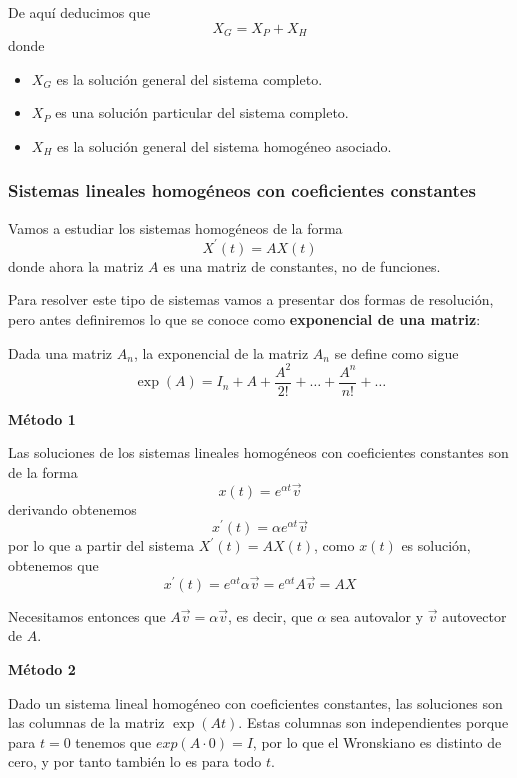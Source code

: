 De aquí deducimos que $$X_G = X_P+X_H$$
donde
\begin{itemize}
\item $X_G$ es la solución general del sistema completo.

\item $X_P$ es una solución particular del sistema completo.

\item $X_H$ es la solución general del sistema homogéneo asociado.
\end{itemize}

\subsubsection{Sistemas lineales homogéneos con coeficientes constantes}
Vamos a estudiar los sistemas homogéneos de la forma $$X^\prime(t) = AX(t)$$
donde ahora la matriz $A$ es una matriz de constantes, no de funciones.

Para resolver este tipo de sistemas vamos a presentar dos formas de resolución, pero antes definiremos lo que se conoce como \textbf{exponencial de una matriz}:

\begin{definition}

Dada una matriz $A_n$, la exponencial de la matriz $A_n$ se define como sigue
$$\exp(A) = I_n + A + \frac{A^2}{2!} + \hdots + \frac{A^n}{n!} + \hdots$$

\end{definition}

\vspace{5mm}
\noindent\textbf{Método 1}

Las soluciones de los sistemas lineales homogéneos con coeficientes constantes son de la forma $$x(t) = e^{\alpha t}\vec{v}$$
derivando obtenemos $$x^\prime(t) = \alpha e^{\alpha t}\vec{v}$$ por lo que a partir del sistema $X^\prime(t) = AX(t)$, como $x(t)$ es solución, obtenemos que $$x^\prime(t) = e^{\alpha t}\alpha\vec{v} = e^{\alpha t}A\vec{v} = AX$$

Necesitamos entonces que $A\vec{v} = \alpha\vec{v}$, es decir, que $\alpha$ sea autovalor y $\vec{v}$ autovector de $A$.

\vspace{5mm}
\noindent\textbf{Método 2}

Dado un sistema lineal homogéneo con coeficientes constantes, las soluciones son las columnas de la matriz $\exp(At)$. Estas columnas son independientes porque para $t=0$ tenemos que $exp(A\cdot0) = I$, por lo que el Wronskiano es distinto de cero, y por tanto también lo es para todo $t$.

